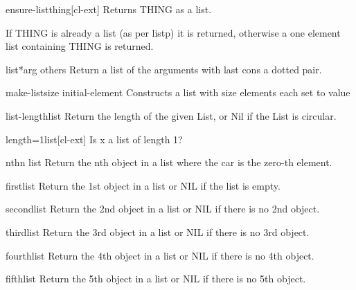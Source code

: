 \documentclass[10pt,english]{book}
\begin{document}
\begin{function}{ensure-list}{thing}[cl-ext]
  Returns THING as a list.

If THING is already a list (as per listp) it is returned,
otherwise a one element list containing THING is returned.
\end{function}

\begin{function}{list*}{arg \rest others}
  Return a list of the arguments with last cons a dotted pair.
\end{function}

\begin{function}{make-list}{size \key initial-element}
  Constructs a list with size elements each set to value
\end{function}

\begin{function}{list-length}{list}
  Return the length of the given List, or Nil if the List is circular.
\end{function}

\begin{function}{length=1}{list}[cl-ext]
  Is x a list of length 1?
\end{function}

\begin{accessor}{nth}{n list}
  Return the nth object in a list where the car is the zero-th element.
\end{accessor}

\begin{accessor}{first}{list}
  Return the 1st object in a list or NIL if the list is empty.
\end{accessor}

\begin{accessor}{second}{list}
  Return the 2nd object in a list or NIL if there is no 2nd object.
\end{accessor}

\begin{accessor}{third}{list}
  Return the 3rd object in a list or NIL if there is no 3rd object.
\end{accessor}

\begin{accessor}{fourth}{list}
  Return the 4th object in a list or NIL if there is no 4th object.
\end{accessor}

\begin{accessor}{fifth}{list}
  Return the 5th object in a list or NIL if there is no 5th object.
\end{accessor}
\end{document}
